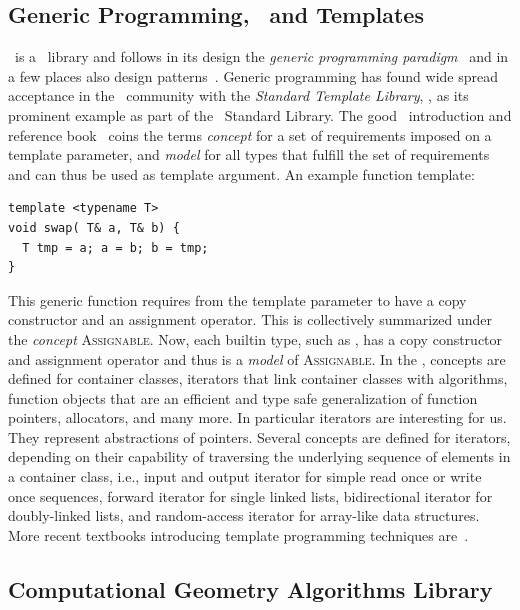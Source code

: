 \subsection{Generic Programming, \CC\ and Templates}

\cgal\ is a \CC\ library and follows in its design the \emph{generic
programming paradigm\/}~\cite{cgal:ms-aogl-94,cgal:sl-stl-95} and in
a few places also design patterns~\cite{Gamma:1995:DP}. Generic
programming has found wide spread acceptance in the \CC\ community
with the \emph{Standard Template Library}, \stl, as its prominent
example as part of the \CC\ Standard Library. The good \stl\ 
introduction and reference book~\cite{cgal:a-gps-98} coins the terms
\emph{concept} for a set of requirements imposed on a template
parameter, and \emph{model\/} for all types that fulfill the set of
requirements and can thus be used as template argument. An example
function template:
\begin{lstlisting}
template <typename T>
void swap( T& a, T& b) {
  T tmp = a; a = b; b = tmp;
}
\end{lstlisting}
This generic  function requires from the template
parameter  to have a copy constructor and an assignment
operator. This is collectively summarized under the \emph{concept\/}
\textsc{Assignable}. Now, each builtin type, such as \CodeFmt{double},
has a copy constructor and assignment operator and thus is a
\emph{model\/} of \textsc{Assignable}. In the \stl , concepts are
defined for container classes, iterators that link container classes
with algorithms, function objects that are an efficient and type safe
generalization of function pointers, allocators, and many more. In
particular iterators are interesting for us. They represent
abstractions of pointers. Several concepts are defined for iterators,
depending on their capability of traversing the underlying sequence of
elements in a container class, i.e., input and output iterator for
simple read once or write once sequences, forward iterator for single
linked lists, bidirectional iterator for doubly-linked lists, and
random-access iterator for array-like data structures. More recent
textbooks introducing template programming techniques
are~\cite{Alexandrescu:2001:MCD,cgal:vj-ctcg-03}.

\subsection{Computational Geometry Algorithms Library}

